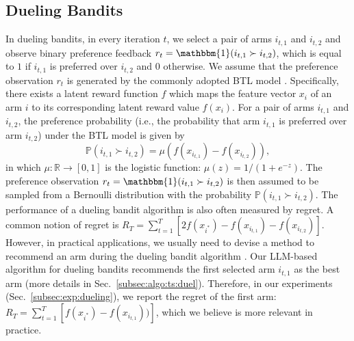 \subsection{Dueling Bandits}
\label{subsec:problem:setting:dueling}
In dueling bandits, in every iteration $t$, we select a pair of arms $i_{t,1}$ and $i_{t,2}$ and observe binary preference feedback $r_t = \mathbbm{1}(i_{t,1}\succ i_{t,2})$, which is equal to $1$ if $i_{t,1}$ is preferred over $i_{t,2}$ and $0$ otherwise.
We assume that the preference observation $r_t$ is generated by the commonly adopted BTL model \cite{Book_luce2005individual,AS04_hunter2004mm}.
Specifically, there exists a latent reward function $f$ which maps the feature vector $x_i$ of an arm $i$ to its corresponding latent reward value $f(x_i)$.
For a pair of arms $i_{t,1}$ and $i_{t,2}$, the preference probability (i.e., the probability that arm $i_{t,1}$ is preferred over arm $i_{t,2}$) under the BTL model is given by
$$
\mathbb{P}(i_{t,1} \succ i_{t,2}) = \mu(f(x_{i_{t,1}}) - f(x_{i_{t,2}})),
$$
in which $\mu: \mathbb{R} \rightarrow [0,1]$ is the logistic function: $\mu(z) = 1/(1+e^{-z})$.
The preference observation $r_t=\mathbbm{1}(i_{t,1}\succ i_{t,2})$ is then assumed to be sampled from a Bernoulli distribution with the probability $\mathbb{P}(i_{t,1} \succ i_{t,2})$.
The performance of a dueling bandit algorithm is also often measured by regret. A common notion of regret is $R_T = \sum^T_{t=1} [2f(x_{i^*}) - f(x_{i_{t,1}}) - f(x_{i_{t,2}})]$.
However, in practical applications, we usually need to devise a method to recommend an arm during the dueling bandit algorithm \cite{lin2024prompt}.
Our LLM-based algorithm for dueling bandits recommends the first selected arm $i_{t,1}$ as the best arm (more details in Sec.~\ref{subsec:algo:ts:duel}).
Therefore, in our experiments (Sec.~\ref{subsec:exp:dueling}), we report the regret of the first arm: $R_T = \sum^T_{t=1} [f(x_{i^*}) - f(x_{i_{t,1}}))]$, which we believe is more relevant in practice.
